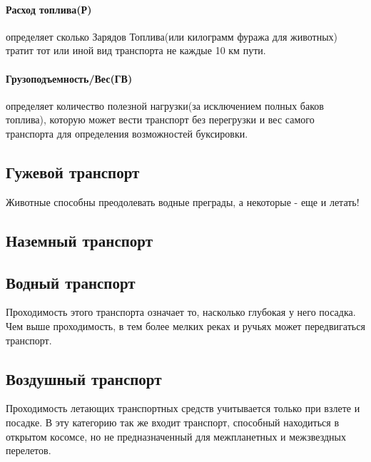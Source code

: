 \paragraph{Расход топлива(Р)} определяет сколько Зарядов Топлива(или килограмм фуража для животных) тратит тот или иной вид транспорта не каждые 10 км пути.
\paragraph{Грузоподъемность/Вес(ГВ)} определяет количество полезной нагрузки(за исключением полных баков топлива), которую может вести транспорт без перегрузки и вес самого транспорта для определения возможностей буксировки.

\subsection{Гужевой транспорт}
Животные способны преодолевать водные преграды, а некоторые - еще и летать!

\subsection{Наземный транспорт}

\subsection{Водный транспорт}
\tbd
Проходимость этого транспорта означает то, насколько глубокая у него посадка. Чем выше проходимость, в тем более мелких реках и ручьях может передвигаться транспорт.

\subsection{Воздушный транспорт}
Проходимость летающих транспортных средств учитывается только при взлете и посадке. В эту категорию так же входит транспорт, способный находиться в открытом косомсе, но не предназначенный для межпланетных и межзвездных перелетов.

